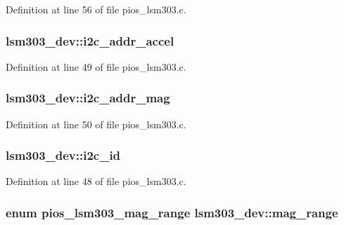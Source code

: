 Definition at line 56 of file pios\-\_\-lsm303.\-c.

\hypertarget{structlsm303__dev_a43a431687ad3d1280504751dd67b99ad}{
\subsubsection[{i2c\-\_\-addr\-\_\-accel}]{ lsm303\-\_\-dev\-::i2c\-\_\-addr\-\_\-accel}}\label{structlsm303__dev_a43a431687ad3d1280504751dd67b99ad}


Definition at line 49 of file pios\-\_\-lsm303.\-c.

\hypertarget{structlsm303__dev_a43b3cb1f2405df34e8542d968e9eb321}{
\subsubsection[{i2c\-\_\-addr\-\_\-mag}]{ lsm303\-\_\-dev\-::i2c\-\_\-addr\-\_\-mag}}\label{structlsm303__dev_a43b3cb1f2405df34e8542d968e9eb321}


Definition at line 50 of file pios\-\_\-lsm303.\-c.

\hypertarget{structlsm303__dev_a30d3092e0b3541399e2901bf71a0e6c2}{
\subsubsection[{i2c\-\_\-id}]{ lsm303\-\_\-dev\-::i2c\-\_\-id}}\label{structlsm303__dev_a30d3092e0b3541399e2901bf71a0e6c2}


Definition at line 48 of file pios\-\_\-lsm303.\-c.

\hypertarget{structlsm303__dev_a9c4089c3f5674a6fc5d51d06d90501cc}{
\subsubsection[{mag\-\_\-range}]{\setlength{\rightskip}{0pt plus 5cm}enum {\bf pios\-\_\-lsm303\-\_\-mag\-\_\-range} lsm303\-\_\-dev\-::mag\-\_\-range}}\label{structlsm303__dev_a9c4089c3f5674a6fc5d51d06d90501cc}


